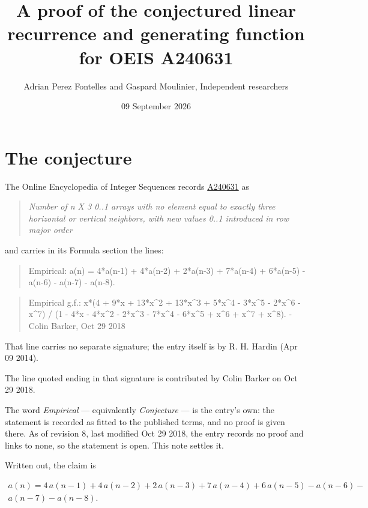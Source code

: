 \documentclass[11pt]{article}
\title{A proof of the conjectured linear recurrence and generating function for OEIS A240631}
\author{Adrian Perez Fontelles and Gaspard Moulinier, Independent researchers}
\date{09 September 2026}
\theoremstyle{definition}
\begin{document}
\maketitle
\section{The conjecture}

The Online Encyclopedia of Integer Sequences records \href{https://oeis.org/A240631}{A240631} as

\begin{quote}\itshape Number of n X 3 0..1 arrays with no element equal to exactly three horizontal or vertical neighbors, with new values 0..1 introduced in row major order\end{quote}

and carries in its Formula section the lines:

\begin{quote}\ttfamily Empirical: a(n) = 4*a(n-1) + 4*a(n-2) + 2*a(n-3) + 7*a(n-4) + 6*a(n-5) - a(n-6) - a(n-7) - a(n-8).\end{quote}

\begin{quote}\ttfamily Empirical g.f.: x*(4 + 9*x + 13*x\textasciicircum{}2 + 13*x\textasciicircum{}3 + 5*x\textasciicircum{}4 - 3*x\textasciicircum{}5 - 2*x\textasciicircum{}6 - x\textasciicircum{}7) / (1 - 4*x - 4*x\textasciicircum{}2 - 2*x\textasciicircum{}3 - 7*x\textasciicircum{}4 - 6*x\textasciicircum{}5 + x\textasciicircum{}6 + x\textasciicircum{}7 + x\textasciicircum{}8). - Colin Barker, Oct 29 2018\end{quote}

That line carries no separate signature; the entry itself is by R. H. Hardin (Apr 09 2014).

The line quoted ending in that signature is contributed by Colin Barker on Oct 29 2018.

The word {\itshape Empirical} --- equivalently {\itshape Conjecture} --- is the entry's own: the statement is recorded as fitted to the published terms, and no proof is given there. As of revision 8, last modified Oct 29 2018, the entry records no proof and links to none, so the statement is open. This note settles it.

Written out, the claim is

\begin{multline*} a(n) = 4\,a(n-1) + 4\,a(n-2) + 2\,a(n-3) + 7\,a(n-4) + 6\,a(n-5) - a(n-6) - \\ a(n-7) - a(n-8). \end{multline*}
\end{document}
